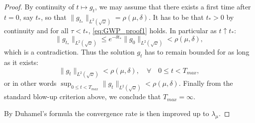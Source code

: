 \documentclass[reqno,11pt,letterpaper]{amsart}
\numberwithin{equation}{section}
\begin{document}
\begin{proof}
By continuity of $t\mapsto g_t$, we may assume that there exists a first time after $t=0$, say $t_*$, so that $\|g_{t_*}\|_{L^2(\sqrt{\omega})}=\rho(\mu,\delta)$. It has to be that $t_*>0$ by continuity and for all $\tau<t_*$, \eqref{eq:GWP_proof1} holds. In particular as $t \uparrow t_*$: 
$$ \|g_{t_*}\|_{L^2(\sqrt{\omega})} \leq e^{-\delta t_*}  \|g_{0}\|_{L^2(\sqrt{\omega})} < \rho(\mu,\delta), $$
which is a contradiction. Thus the solution $g_t$ has to remain bounded for as long as it exists: 
$$ \|g_{t}\|_{L^2(\sqrt{\omega})} < \rho(\mu,\delta),  \quad \forall\quad 0\leq t < T_{max},$$
or in other words $\sup_{0\leq t < T_{max}} \|g_{t}\|_{L^2(\sqrt{\omega})} < \rho(\mu,\delta)$.  Finally from the standard blow-up criterion above, we conclude that $T_{max}=\infty$. 

By Duhamel's formula the convergence rate is then improved up to $\lambda_\mu$.
\end{proof}



\end{document}
